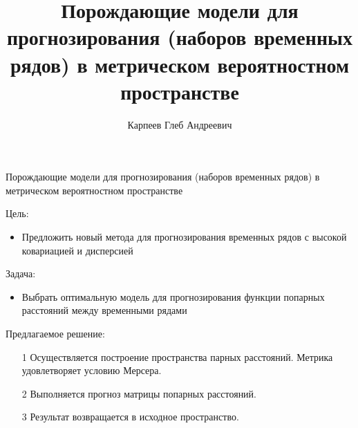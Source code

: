 \documentclass{beamer}
\title[\hbox to 56mm{Порождающие модели для прогнозирования}]{Порождающие модели для прогнозирования (наборов временных рядов) в метрическом вероятностном пространстве}
\author[Г.\,А. Карпеев]{Карпеев Глеб Андреевич}
\institute{Московский физико-технический институт}
\date{\footnotesize
\par\smallskip\emph{Научный руководитель:} д.ф-м.н. Стрижов Вадим Викторович
\par\bigskip\small 2024}
\begin{document}
\begin{frame}
\thispagestyle{empty}
\maketitle
\end{frame}

\begin{frame}{Порождающие модели для прогнозирования (наборов временных рядов) в метрическом вероятностном пространстве}
\begin{block}{Цель:}
\begin{itemize}
 \item Предложить новый метода для прогнозирования
временных рядов с высокой ковариацией и дисперсией
\end{itemize}

\end{block}

\begin{block}{Задача:}
\begin{itemize}
 \item Выбрать оптимальную модель для прогнозирования функции попарных расстояний между временными рядами
\end{itemize}

\end{block}

\begin{block}{Предлагаемое решение:}
\begin{itemize}
    \item [1] Осуществляется построение пространства парных расстояний. Метрика удовлетворяет условию Мерсера.

    \item [2] Выполняется прогноз матрицы попарных расстояний.

    \item [3] Результат возвращается в исходное пространство.
\end{itemize}
\end{block}


\end{frame}
\end{document}
